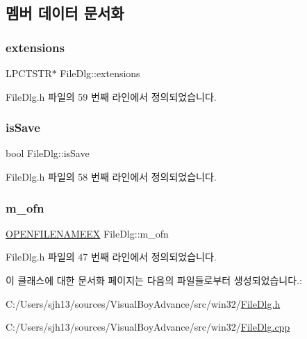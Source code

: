 \subsection{멤버 데이터 문서화}
\mbox{\label{class_file_dlg_a5ee21f6dd33189d20e302e994323d578}} 
\subsubsection{\texorpdfstring{extensions}{extensions}}
{\footnotesize\ttfamily L\+P\+C\+T\+S\+TR$\ast$ File\+Dlg\+::extensions\hspace{0.3cm}{\ttfamily [protected]}}



File\+Dlg.\+h 파일의 59 번째 라인에서 정의되었습니다.

\mbox{\label{class_file_dlg_aea50dcea1e8ef52d9b61f9cd37a69c0f}} 
\subsubsection{\texorpdfstring{is\+Save}{isSave}}
{\footnotesize\ttfamily bool File\+Dlg\+::is\+Save\hspace{0.3cm}{\ttfamily [protected]}}



File\+Dlg.\+h 파일의 58 번째 라인에서 정의되었습니다.

\mbox{\label{class_file_dlg_a3ee514d5dca456bd90c598af5412269a}} 
\subsubsection{\texorpdfstring{m\+\_\+ofn}{m\_ofn}}
{\footnotesize\ttfamily \mbox{\hyperlink{struct_o_p_e_n_f_i_l_e_n_a_m_e_e_x}{O\+P\+E\+N\+F\+I\+L\+E\+N\+A\+M\+E\+EX}} File\+Dlg\+::m\+\_\+ofn}



File\+Dlg.\+h 파일의 47 번째 라인에서 정의되었습니다.



이 클래스에 대한 문서화 페이지는 다음의 파일들로부터 생성되었습니다.\+:\begin{DoxyCompactItemize}
\item 
C\+:/\+Users/sjh13/sources/\+Visual\+Boy\+Advance/src/win32/\mbox{\hyperlink{_file_dlg_8h}{File\+Dlg.\+h}}\item 
C\+:/\+Users/sjh13/sources/\+Visual\+Boy\+Advance/src/win32/\mbox{\hyperlink{_file_dlg_8cpp}{File\+Dlg.\+cpp}}\end{DoxyCompactItemize}
